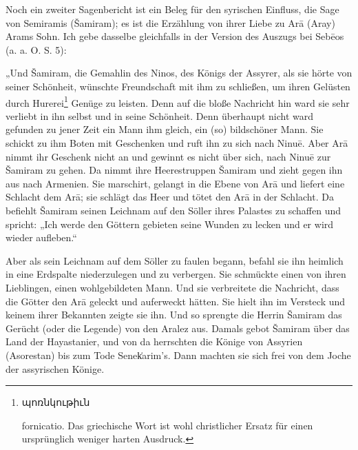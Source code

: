 \documentclass{article}
\begin{document}
Noch ein zweiter Sagenbericht ist ein Beleg für den syrischen Einfluss, die Sage von Semiramis (Šamiram); es ist die Erzählung von ihrer Liebe zu Arā (Aray) Arams Sohn. Ich gebe dasselbe gleichfalls in der Version des Auszugs bei Sebēos (a. a. O. S. 5):

„Und Šamiram, die Gemahlin des Ninos, des Königs der Assyrer, als sie hörte von seiner Schönheit, wünschte Freundschaft mit ihm zu schließen, um ihren Gelüsten durch Hurerei\footnote{\begin{armenian}պոռնկութիւն\end{armenian} fornicatio. Das griechische Wort ist wohl christlicher Ersatz für einen ursprünglich weniger harten Ausdruck.} Genüge zu leisten. Denn auf die bloße Nachricht hin ward sie sehr verliebt in ihn selbst und in seine Schönheit. Denn überhaupt nicht ward gefunden zu jener Zeit ein Mann ihm gleich, ein (so) bildschöner Mann. Sie schickt zu ihm Boten mit Geschenken und ruft ihn zu sich nach Ninuē. Aber Arā nimmt ihr Geschenk nicht an und gewinnt es nicht über sich, nach Ninuē zur Šamiram zu gehen. Da nimmt ihre Heerestruppen Šamiram und zieht gegen ihn aus nach Armenien. Sie marschirt, gelangt in die Ebene von Arā und liefert eine Schlacht dem Arā; sie schlägt das Heer und tötet den Arā in der Schlacht. Da befiehlt Šamiram seinen Leichnam auf den Söller ihres Palastes zu schaffen und spricht: „Ich werde den Göttern gebieten seine Wunden zu lecken und er wird wieder aufleben.“

Aber als sein Leichnam auf dem Söller zu faulen begann, befahl sie ihn heimlich in eine Erdspalte niederzulegen und zu verbergen. Sie schmückte einen von ihren Lieblingen, einen wohlgebildeten Mann. Und sie verbreitete die Nachricht, dass die Götter den Arā geleckt und auferweckt hätten. Sie hielt ihn im Versteck und keinem ihrer Bekannten zeigte sie ihn. Und so sprengte die Herrin Šamiram das Gerücht (oder die Legende) von den Aralez aus. Damals gebot Šamiram über das Land der Hayastanier, und von da herrschten die Könige von Assyrien (Asorestan) bis zum Tode Senek͑arim's. Dann machten sie sich frei von dem Joche der assyrischen Könige.
\end{document}
